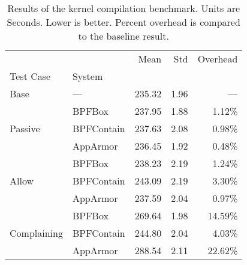 \begin{table}[htp!]
\centering
\footnotesize
\caption[Results of the kernel compilation benchmark]{Results of the kernel compilation benchmark. Units are Seconds. Lower is better. Percent overhead is compared to the baseline result.}
\label{tab:phoronix-kernel-compilation}
\begin{tabular}{llrrr}
\toprule
            &          &    Mean &   Std & Overhead \\
Test Case & System &         &       &          \\
\midrule
Base & --- &  235.32 &  1.96 &      --- \\
\cline{1-5}
\multirow{3}{*}{Passive} & BPFBox &  237.95 &  1.88 &   1.12\% \\
            & BPFContain &  237.63 &  2.08 &   0.98\% \\
            & AppArmor &  236.45 &  1.92 &   0.48\% \\
\cline{1-5}
\multirow{3}{*}{Allow} & BPFBox &  238.23 &  2.19 &   1.24\% \\
            & BPFContain &  243.09 &  2.19 &   3.30\% \\
            & AppArmor &  237.59 &  2.04 &   0.97\% \\
\cline{1-5}
\multirow{3}{*}{Complaining} & BPFBox &  269.64 &  1.98 &  14.59\% \\
            & BPFContain &  244.80 &  2.04 &   4.03\% \\
            & AppArmor &  288.54 &  2.11 &  22.62\% \\
\bottomrule
\end{tabular}
\end{table}
